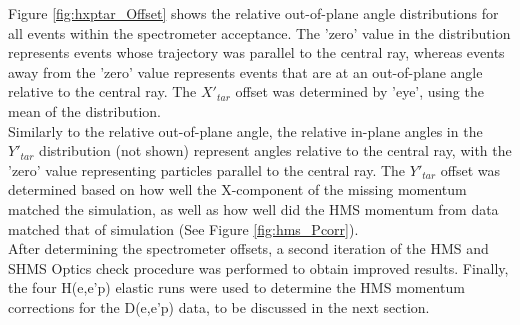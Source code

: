 \documentclass[11pt]{article}
\begin{document}
Figure \ref{fig:hxptar_Offset} shows the relative out-of-plane angle distributions for all events within the spectrometer acceptance. The 'zero' value in the distribution
represents events whose trajectory was parallel to the central ray, whereas events away from the 'zero' value represents events that are at an out-of-plane angle relative
to the central ray. The $X'_{tar}$ offset was determined by 'eye', using the mean of the distribution. \\
\indent Similarly to the relative out-of-plane angle, the relative in-plane angles in the $Y'_{tar}$ distribution (not shown) represent angles relative to the central ray, with the
'zero' value representing particles parallel to the central ray. The $Y'_{tar}$ offset was determined based on how well the X-component of the missing momentum matched
the simulation, as well as how well did the HMS momentum from data matched that of simulation (See Figure \ref{fig:hms_Pcorr}). \\
\indent After determining the spectrometer offsets, a second iteration of the HMS and SHMS Optics check procedure was performed to obtain
improved results. Finally, the four H(e,e'p) elastic runs were used to determine the HMS momentum corrections for the D(e,e'p) data, to be discussed in the next section.
\end{document}
